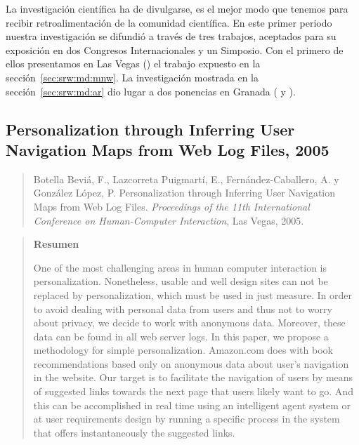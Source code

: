La investigación científica ha de divulgarse, es el mejor modo que tenemos para recibir retroalimentación de la comunidad científica. En este primer periodo nuestra investigación se difundió a través de tres trabajos, aceptados para su exposición en dos Congresos Internacionales y un Simposio. Con el primero de ellos presentamos en Las Vegas () el trabajo expuesto en la sección~\ref{sec:srw:md:mnw}. La investigación mostrada en la sección~\ref{sec:srw:md:ar} dio lugar a dos ponencias en Granada ( y ).



\subsection*{Personalization through Inferring User Navigation Maps from Web Log Files, 2005}
\label{sec:nuestro-Personalization-2005}

\begin{quote}
  Botella Beviá, F., Lazcorreta Puigmartí, E., Fernández-Caballero, A. y González López, P. Personalization through Inferring User Navigation Maps from Web Log Files. \emph{Proceedings of the 11th International Conference on Human-Computer Interaction}, Las Vegas, 2005.  
\end{quote}

\begin{quotation}
	\noindent\textbf{Resumen}

	\nopagebreak One of the most challenging areas in human computer interaction is personalization. Nonetheless, usable and well design sites can not be replaced by personalization, which must be used in just measure. In order to avoid dealing with personal data from users and thus not to worry about privacy, we decide to work with anonymous data. Moreover, these data can be found in all web server logs. In this paper, we propose a methodology for simple personalization. Amazon.com does with book recommendations based only on anonymous data about user's navigation in the website. Our target is to facilitate the navigation of users by means of suggested links towards the next page that users likely want to go. And this can be accomplished in real time using an intelligent agent system or at user requirements design by running a specific process in the system that offers instantaneously the suggested links.
\end{quotation}





